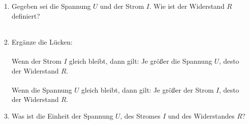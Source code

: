\documentclass[task=1]{exercise}
\begin{document}
  \begin{enumerate}[label=\textnormal{\alph*)}]
    \item Gegeben sei die Spannung $U$ und der Strom $I$. Wie ist der Widerstand $R$ definiert?\\~\\
    \item Ergänze die Lücken:\\~\\
    Wenn der Strom $I$ gleich bleibt, dann gilt: Je größer die Spannung $U$, desto \luecke{3cm} der Widerstand $R$.\\~\\
    Wenn die Spannung $U$ gleich bleibt, dann gilt: Je größer der Strom $I$, desto \luecke{3cm} der Widerstand $R$.
    \item Was ist die Einheit der Spannung $U$, des Stromes $I$ und des Widerstandes $R$?\\~\\
  \end{enumerate}
  
\end{document}
